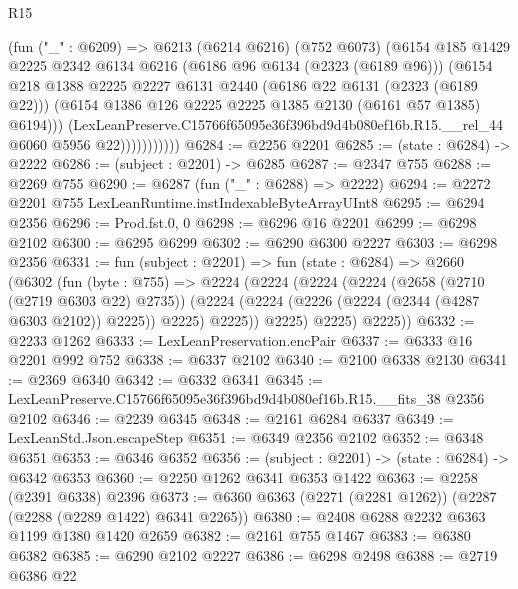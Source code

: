 \begin{lexlean}{R15}
\begin{coremodule}
                      (fun ("_" : @6209) =>
                      @6213
                        (@6214 @6216)
                        (@752 @6073)
                        (@6154
                          @185
                          @1429
                          @2225
                          @2342
                          @6134
                          @6216
                          (@6186 @96 @6134 (@2323 (@6189 @96)))
                          (@6154
                            @218
                            @1388
                            @2225
                            @2227
                            @6131
                            @2440
                            (@6186 @22 @6131 (@2323 (@6189 @22)))
                            (@6154 @1386 @126 @2225 @2225 @1385 @2130 (@6161 @57 @1385) @6194)))
                        (LexLeanPreserve.C15766f65095e36f396bd9d4b080ef16b.R15.__rel_44
                          @6060
                          @5956
                          @22)))))))))))
@6284 := @2256 @2201
@6285 := (state : @6284) -> @2222
@6286 := (subject : @2201) -> @6285
@6287 := @2347 @755
@6288 := @2269 @755
@6290 := @6287 (fun ("_" : @6288) => @2222)
@6294 := @2272 @2201 @755 LexLeanRuntime.instIndexableByteArrayUInt8
@6295 := @6294 @2356
@6296 := Prod.fst.{0, 0}
@6298 := @6296 @16 @2201
@6299 := @6298 @2102
@6300 := @6295 @6299
@6302 := @6290 @6300 @2227
@6303 := @6298 @2356
@6331 := fun (subject : @2201) =>
  fun (state : @6284) =>
  @2660
    (@6302
      (fun (byte : @755) =>
      @2224
        (@2224
          (@2224
            (@2224
              (@2658 (@2710 (@2719 @6303 @22) @2735))
              (@2224 (@2224 (@2226 (@2224 (@2344 (@4287 @6303 @2102)) @2225)) @2225) @2225))
            @2225)
          @2225)
        @2225))
@6332 := @2233 @1262
@6333 := LexLeanPreservation.encPair
@6337 := @6333 @16 @2201 @992 @752
@6338 := @6337 @2102
@6340 := @2100 @6338 @2130
@6341 := @2369 @6340
@6342 := @6332 @6341
@6345 := LexLeanPreserve.C15766f65095e36f396bd9d4b080ef16b.R15.__fits_38 @2356 @2102
@6346 := @2239 @6345
@6348 := @2161 @6284 @6337
@6349 := LexLeanStd.Json.escapeStep
@6351 := @6349 @2356 @2102
@6352 := @6348 @6351
@6353 := @6346 @6352
@6356 := (subject : @2201) -> (state : @6284) -> @6342 @6353
@6360 := @2250 @1262 @6341 @6353 @1422
@6363 := @2258 (@2391 @6338) @2396
@6373 := @6360 @6363 (@2271 (@2281 @1262)) (@2287 (@2288 (@2289 @1422) @6341 @2265))
@6380 := @2408 @6288 @2232 @6363 @1199 @1380 @1420 @2659
@6382 := @2161 @755 @1467
@6383 := @6380 @6382
@6385 := @6290 @2102 @2227
@6386 := @6298 @2498
@6388 := @2719 @6386 @22

\end{coremodule}
\end{lexlean}
